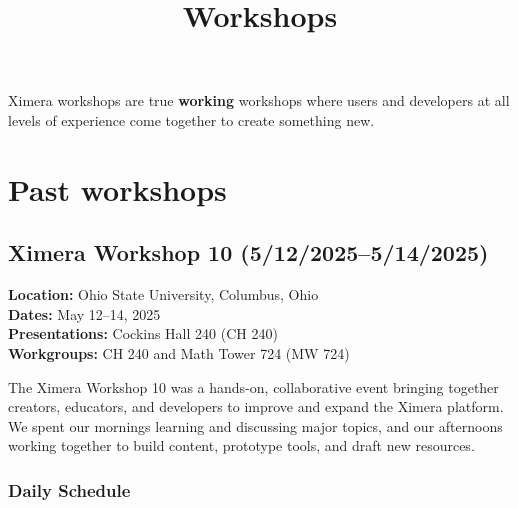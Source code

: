 \documentclass{ximera}
\title{Workshops}
\begin{document}
\begin{abstract}
\end{abstract}
\maketitle

Ximera workshops are true \textbf{working} workshops where users and developers at all levels of experience come together to create something new.

\section*{Past workshops}


\subsection*{Ximera Workshop 10 (5/12/2025--5/14/2025)}

\textbf{Location:} Ohio State University, Columbus, Ohio\\
\textbf{Dates:} May 12--14, 2025\\
\textbf{Presentations:} Cockins Hall 240 (CH 240)\\
\textbf{Workgroups:} CH 240 and Math Tower 724 (MW 724)

The Ximera Workshop 10 was a hands-on, collaborative event bringing together creators, educators, and developers to improve and expand the Ximera platform. 
%
We spent our mornings learning and discussing major topics, and our afternoons working together to build content, prototype tools, and draft new resources.

\subsubsection*{Daily Schedule}
\end{document}

